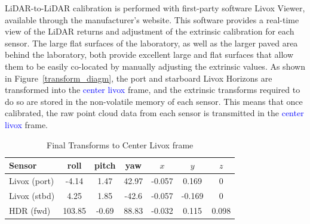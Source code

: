 

LiDAR-to-LiDAR calibration is performed with first-party software Livox Viewer, available through the manufacturer's website.
This software provides a real-time view of the LiDAR returns and adjustment of the extrinsic calibration for each sensor.
The large flat surfaces of the laboratory, as well as the larger paved area behind the laboratory, both provide excellent large and flat surfaces that allow them to be easily co-located by manually adjusting the extrinsic values.
As shown in Figure~\ref{transform_diagm}, the port and starboard Livox Horizons are transformed into the \textcolor{blue}{center livox} frame, and the extrinsic transforms required to do so are stored in the non-volatile memory of each sensor. This means that once calibrated, the raw point cloud data from each sensor is transmitted in the \textcolor{blue}{center livox} frame.




\begin{table}[ht]
\caption{Final Transforms to Center Livox frame}
\label{extrinsics}
\centering
\begin{tabular}{l|cccccc}
Sensor &  roll & pitch & yaw & $x$ & $y$ & $z$\\
\hline \hline 
Livox (port)  & -4.14 & 1.47 & 42.97 & -0.057 & 0.169 & 0\\ \hline
Livox (stbd) & 4.25 & 1.85 & -42.6 & -0.057 & -0.169 & 0\\ \hline
\hline

HDR (fwd) & 103.85 & -0.69 & 88.83 & -0.032 &0.115 & 0.098\\ \hline
\end{tabular} \label{tbl:extrinsic}
\end{table}
            
